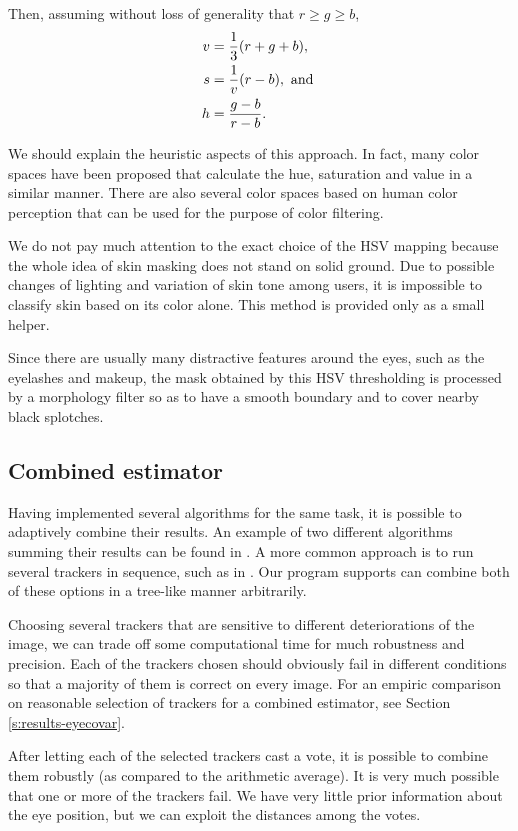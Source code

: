 Then, assuming without loss of generality that $r \geq g \geq b$,
\begin{align}
v &= \frac 1 3 (r + g + b), \notag \\
s &= \frac 1 v (r - b ), \textrm{ and } \\
h &= \frac {g - b} {r - b}. \notag
\end{align}


We should explain the heuristic aspects of this approach.
In fact, many color spaces have been proposed that calculate the hue, saturation and value in a similar manner.
There are also several color spaces based on human color perception that can be used for the purpose of color filtering.

We do not pay much attention to the exact choice of the HSV mapping because the whole idea of skin masking does not stand on solid ground.
Due to possible changes of lighting and variation of skin tone among users, it is impossible to classify skin based on its color alone.
This method is provided only as a small helper.

Since there are usually many distractive features around the eyes, such as the eyelashes and makeup, the mask obtained by this HSV thresholding is processed by a morphology filter so as to have a smooth boundary and to cover nearby black splotches.

\subsection{Combined estimator}

Having implemented several algorithms for the same task, it is possible to adaptively combine their results.
An example of two different algorithms summing their results can be found in \cite{leo14}.
A more common approach is to run several trackers in sequence, such as in \cite{wang16,george16,zhu12}.
Our program supports can combine both of these options in a tree-like manner arbitrarily.

Choosing several trackers that are sensitive to different deteriorations of the image, we can trade off some computational time for much robustness and precision.
Each of the trackers chosen should obviously fail in different conditions so that a majority of them is correct on every image.
For an empiric comparison on reasonable selection of trackers for a combined estimator, see Section \ref{s:results-eyecovar}.

After letting each of the selected trackers cast a vote, it is possible to combine them robustly (as compared to the arithmetic average).
It is very much possible that one or more of the trackers fail.
We have very little prior information about the eye position, but we can exploit the distances among the votes.

